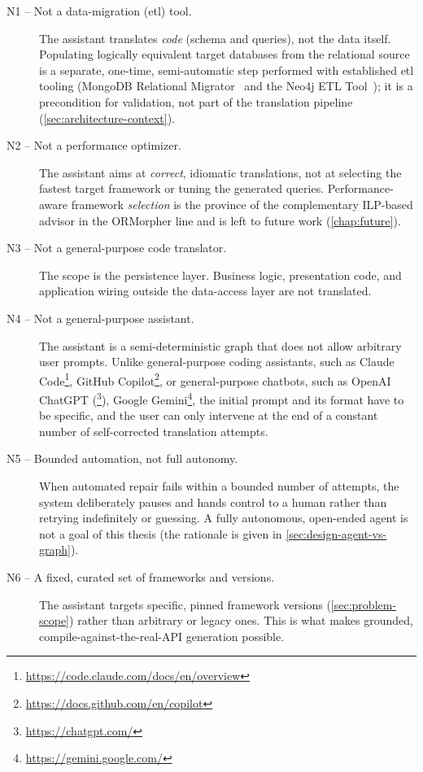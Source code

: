 \begin{description}
  \label{item:non-goal-n1} \item[N1 -- Not a data-migration (\acrshort{etl}) tool.] The assistant translates \emph{code} (schema and queries), not the data itself. Populating logically equivalent target databases from the relational source is a separate, one-time, semi-automatic step performed with established \Acrfull{etl} tooling (MongoDB Relational Migrator~\cite{mongo-rel-migrator} and the Neo4j ETL Tool~\cite{neo4j-etl-tool}); it is a precondition for validation, not part of the translation pipeline (\cref{sec:architecture-context}).

  \item[N2 -- Not a performance optimizer.] The assistant aims at \emph{correct}, idiomatic translations, not at selecting the fastest target framework or tuning the generated queries. Performance-aware framework \emph{selection} is the province of the complementary ILP-based advisor in the ORMorpher line \cite{abrahamUnifiedFrameworkORM} and is left to future work (\cref{chap:future}).

  \item[N3 -- Not a general-purpose code translator.] The scope is the persistence layer. Business logic, presentation code, and application wiring outside the data-access layer are not translated.
  
  \item[N4 -- Not a general-purpose assistant.] The assistant is a semi-deterministic graph that does not allow arbitrary user prompts. Unlike general-purpose coding assistants, such as Claude Code\footnote{\url{https://code.claude.com/docs/en/overview}}, GitHub Copilot\footnote{\url{https://docs.github.com/en/copilot}}, or general-purpose chatbots, such as OpenAI ChatGPT (\footnote{\url{https://chatgpt.com/}}), Google Gemini\footnote{\url{https://gemini.google.com/}}, the initial prompt and its format have to be specific, and the user can only intervene at the end of a constant number of self-corrected translation attempts.

  \item[N5 -- Bounded automation, not full autonomy.] When automated repair fails within a bounded number of attempts, the system deliberately pauses and hands control to a human rather than retrying indefinitely or guessing. A fully autonomous, open-ended agent is not a goal of this thesis (the rationale is given in \cref{sec:design-agent-vs-graph}).

  \item[N6 -- A fixed, curated set of frameworks and versions.] The assistant targets specific, pinned framework versions (\cref{sec:problem-scope}) rather than arbitrary or legacy ones. This is what makes grounded, compile-against-the-real-API generation possible.
\end{description}

